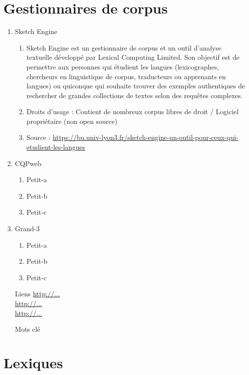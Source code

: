\documentclass{book}
\begin{document}
\section{Gestionnaires de corpus}
\begin{enumerate}
	\item Sketch Engine
        \begin{enumerate}
            \item Sketch Engine est un gestionnaire de corpus et un outil d'analyse textuelle développé par Lexical Computing Limited. Son objectif est de permettre aux personnes qui étudient les langues (lexicographes, chercheurs en linguistique de corpus, traducteurs ou apprenants en langues) ou quiconque qui souhaite trouver des exemples authentiques de rechercher de grandes collections de textes selon des requêtes complexes.
            \item Droits d'usage : Contient de nombreux corpus libres de droit / Logiciel propriétaire (non open source)
            \item Source : \url{https://bu.univ-lyon3.fr/sketch-engine-un-outil-pour-ceux-qui-etudient-les-langues}
        \end{enumerate}
	\item CQPweb
        \begin{enumerate}
            \item Petit-a
            \item Petit-b
            \item Petit-c
        \end{enumerate}
	\item Grand-3
        \begin{enumerate}
            \item Petit-a
            \item Petit-b
            \item Petit-c
        \end{enumerate}
\end{enumerate}

\begin{itemize}
    \item [Liens]
        \url{http://...}\\
        \url{http://...}\\
        \url{http://...}\\
    \item [Mots clé]
\end{itemize}

\section{Lexiques}
\end{document}
